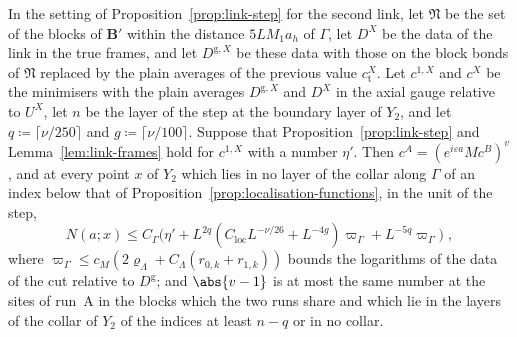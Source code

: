 
\begin{lemma}\label{lem:link-cut}
In the setting of Proposition~\ref{prop:link-step} for the second link, let $\mathfrak N$ be the set of the blocks of $\mathbf B'$ within the distance $5LM_1a_h$ of $\Gamma$, let $D^X$ be the data of the link in the true frames, and let $D^{\mathrm g,X}$ be these data with those on the block bonds of $\mathfrak N$ replaced by the plain averages of the previous value $c^X_{\mathrm t}$. Let $c^{1,X}$ and $c^X$ be the minimisers with the plain averages $D^{\mathrm g,X}$ and $D^X$ in the axial gauge relative to $U^X$, let $n$ be the layer of the step at the boundary layer of $Y_2$, and let $q \coloneqq \lceil\nu/250\rceil$ and $g \coloneqq \lceil\nu/100\rceil$. Suppose that Proposition~\ref{prop:link-step} and Lemma~\ref{lem:link-frames} hold for $c^{1,X}$ with a number $\eta'$. Then $c^A = (e^{i\varepsilon a}Mc^B)^v$, and at every point $x$ of $Y_2$ which lies in no layer of the collar along $\Gamma$ of an index below that of Proposition~\ref{prop:localisation-functions}, in the unit of the step,
\[
    N(a; x) \leq C_\Gamma\bigl(\eta' + L^{2q}(C_{\mathrm{loc}}L^{-\nu/26} + L^{-4g})\varpi_\Gamma + L^{-5q}\varpi_\Gamma\bigr)\;,
\]
where $\varpi_\Gamma \leq c_M(2\varrho_\Lambda + C_\Lambda(r_{0,k} + r_{1,k}))$ bounds the logarithms of the data of the cut relative to $D^{\mathrm g}$; and $\abs{v - 1}$ is at most the same number at the sites of run~A in the blocks which the two runs share and which lie in the layers of the collar of $Y_2$ of the indices at least $n - q$ or in no collar.
\end{lemma}

